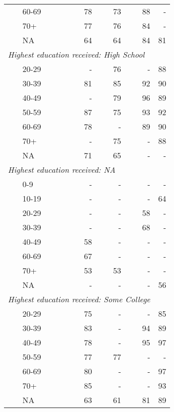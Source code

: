 \documentclass{article}
\begin{document}
\begin{longtable}{llrrrr}
 &  60-69 & 78 & 73 & 88 & - \\
 &  70+ & 77 & 76 & 84 & - \\
 & NA & 64 & 64 & 84 & 81 \\
\multicolumn{ 5 }{l}{\textit{ Highest education received: High School }}\\
&  20-29 & - & 76 & - & 88 \\
 &  30-39 & 81 & 85 & 92 & 90 \\
 &  40-49 & - & 79 & 96 & 89 \\
 &  50-59 & 87 & 75 & 93 & 92 \\
 &  60-69 & 78 & - & 89 & 90 \\
 &  70+ & - & 75 & - & 88 \\
 & NA & 71 & 65 & - & - \\
\multicolumn{ 5 }{l}{\textit{ Highest education received: NA }}\\
&  0-9 & - & - & - & - \\
 &  10-19 & - & - & - & 64 \\
 &  20-29 & - & - & 58 & - \\
 &  30-39 & - & - & 68 & - \\
 &  40-49 & 58 & - & - & - \\
 &  60-69 & 67 & - & - & - \\
 &  70+ & 53 & 53 & - & - \\
 & NA & - & - & - & 56 \\
\multicolumn{ 5 }{l}{\textit{ Highest education received: Some College }}\\
&  20-29 & 75 & - & - & 85 \\
 &  30-39 & 83 & - & 94 & 89 \\
 &  40-49 & 78 & - & 95 & 97 \\
 &  50-59 & 77 & 77 & - & - \\
 &  60-69 & 80 & - & - & 97 \\
 &  70+ & 85 & - & - & 93 \\
 & NA & 63 & 61 & 81 & 89 \\
\end{longtable}

\endgroup
\end{document}
